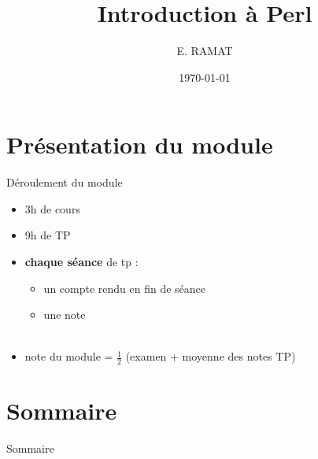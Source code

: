 \documentclass[sans, mathsans, professionalfonts, compress, smaller, table,
               xcolor=pdftex, dvipsnames]{beamer}
\title[Erlang]{Introduction à Perl}
\subtitle{}
\author[E. Ramat]{E. RAMAT}
\institute[ULCO]{Université du Littoral - Côte d'Opale}
\date{\today}
\begin{document}
\begin{frame}
  \titlepage
\end{frame}

\section*{Présentation du module}
\begin{frame}{Déroulement du module}
  \begin{itemize}
  \item 3h de cours
  \item 9h de TP
  \item \textbf{chaque séance} de tp :
    \begin{itemize}
    \item un compte rendu en fin de séance
    \item une note\\~
    \end{itemize}
  \item note du module = ${\frac{1}{2}}$ (examen + moyenne des notes TP)
  \end{itemize}
\end{frame}

\section*{Sommaire}
\begin{frame}{Sommaire}
\tableofcontents
\end{frame}













\end{document}

